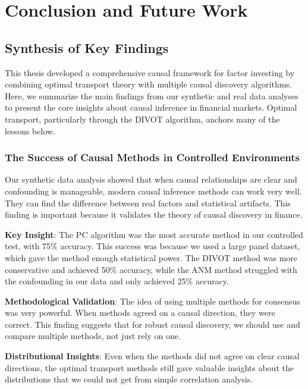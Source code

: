 \chapter{Conclusion and Future Work}
\label{ch:conclusion}

\section{Synthesis of Key Findings}

This thesis developed a comprehensive causal framework for factor investing by combining optimal transport theory with multiple causal discovery algorithms. Here, we summarize the main findings from our synthetic and real data analyses to present the core insights about causal inference in financial markets. Optimal transport, particularly through the DIVOT algorithm, anchors many of the lessons below.

\subsection{The Success of Causal Methods in Controlled Environments}

Our synthetic data analysis showed that when causal relationships are clear and confounding is manageable, modern causal inference methods can work very well. They can find the difference between real factors and statistical artifacts. This finding is important because it validates the theory of causal discovery in finance.

\textbf{Key Insight}: The PC algorithm was the most accurate method in our controlled test, with 75\% accuracy. This success was because we used a large panel dataset, which gave the method enough statistical power. The DIVOT method was more conservative and achieved 50\% accuracy, while the ANM method struggled with the confounding in our data and only achieved 25\% accuracy.

\textbf{Methodological Validation}: The idea of using multiple methods for consensus was very powerful. When methods agreed on a causal direction, they were correct. This finding suggests that for robust causal discovery, we should use and compare multiple methods, not just rely on one.

\textbf{Distributional Insights}: Even when the methods did not agree on clear causal directions, the optimal transport methods still gave valuable insights about the distributions that we could not get from simple correlation analysis.


